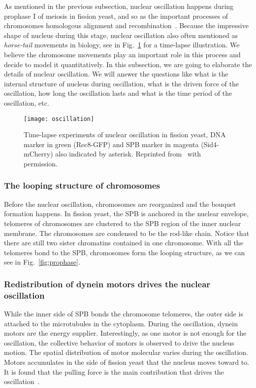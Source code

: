 As mentioned in the previous subsection, nuclear oscillation happens during prophase I of meiosis in fission yeast, and so as the important processes of chromosomes homologous alignment and recombination~\cite{Ding1998}. Because the impressive shape of nucleus during this stage, nuclear oscillation also often mentioned as \emph{horse-tail} movements in biology\cite{Koszul2009a,Wells2006,Davis2001}, see in Fig.~\ref{fig:oscillation} for a time-lapse illustration. We believe the chromosome movements play an important role in this process and decide to model it quantitatively. In this subsection, we are going to elaborate the details of nuclear oscillation. We will answer the questions like what is the internal structure of nucleus during oscillation, what is the driven force of the oscillation, how long the oscillation lasts and what is the time period of the oscillation, etc.
\begin{figure}[htpb]
    \centering
    \texttt{[image: oscillation]}
    \caption{Time-lapse experiments of nuclear oscillation in fission yeast, DNA marker in green (Rec8-GFP) and SPB marker in magenta (Sid4-mCherry) also indicated by asterisk. Reprinted from~\cite{Chacon2016} with permission.}
    \label{fig:oscillation}
\end{figure}

\subsubsection{The looping structure of chromosomes}
Before the nuclear oscillation, chromosomes are reorganized and the bouquet formation happens. In fission yeast, the SPB is anchored in the nuclear envelope, telomeres of chromosomes are clustered to the SPB region of the inner nuclear membrane. The chromosomes are condensed to be the rod-like chain. Notice that there are still two sister chromatins contained in one chromosome. With all the telomeres bond to the SPB, chromosomes form the looping structure, as we can see in Fig.~\ref{fig:prophase}. 

\subsubsection{Redistribution of dynein motors drives the nuclear oscillation}
While the inner side of SPB bonds the chromosome telomeres, the outer side is attached to the microtubules in the cytoplasm. During the oscillation, dynein motors are the energy supplier. Interestingly, as one motor is not enough for the oscillation, the collective behavior of motors is observed to drive the nucleus motion. The spatial distribution of motor molecular varies during the oscillation. Motors accumulates in the side of fission yeast that the nucleus moves toward to. It is found that the pulling force is the main contribution that drives the oscillation~\cite{Vogel2009}.

